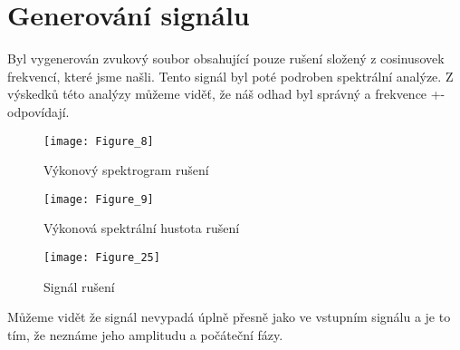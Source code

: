 \section{Generování signálu}

Byl vygenerován zvukový soubor obsahující pouze rušení složený z cosinusovek frekvencí, které jsme našli. Tento signál byl poté podroben spektrální analýze.
Z výskedků této analýzy můžeme viděť, že náš odhad byl správný a frekvence +- odpovídají.

\begin{figure}[H] 
	\centering
	\texttt{[image: Figure\_8]}
	\caption{Výkonový spektrogram rušení}
\end{figure}

\begin{figure}[H] 
	\centering
	\texttt{[image: Figure\_9]}
	\caption{Výkonová spektrální hustota rušení}
\end{figure}

\begin{landscape}
\begin{figure}[H] 
	\centering
	\texttt{[image: Figure\_25]}
	\caption{Signál rušení}
\end{figure}
\end{landscape}

Můžeme vidět že signál nevypadá úplně přesně jako ve vstupním signálu a je to tím, že neznáme jeho amplitudu a počáteční fázy.
